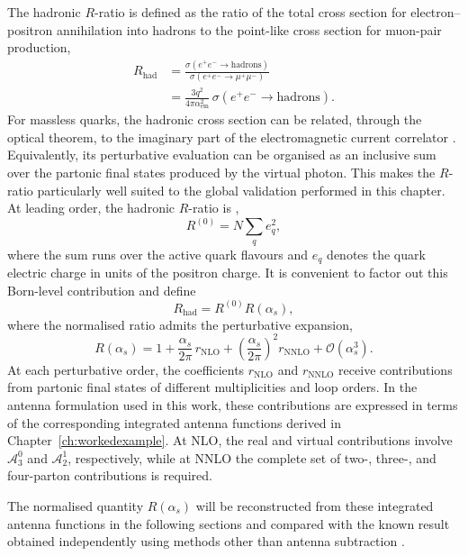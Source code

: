 The hadronic $R$-ratio is defined as the ratio of the total cross section for electron--positron
annihilation into hadrons to the point-like cross section for muon-pair production,
\begin{equation}
    \begin{split}
        R_\text{had} &= \frac{\sigma(e^+e^-\to\text{hadrons})}{\sigma(e^+e^-\to\mu^+\mu^-)}\\
          &= \frac{3q^2}{4\pi\alpha_\text{em}^2}\,\sigma(e^+e^-\to\text{hadrons}).
    \end{split}
\end{equation}
For massless quarks, the hadronic cross section can be related, through the optical theorem, to the
imaginary part of the electromagnetic current correlator
\cite{GehrmannDeRidder0311276,Adler1974}. Equivalently, its perturbative evaluation can be organised
as an inclusive sum over the partonic final states produced by the virtual photon. This makes the
$R$-ratio particularly well suited to the global validation performed in this chapter. At leading
order, the hadronic $R$-ratio is \cite{Ellis:1996mzs},
\begin{equation}
    R^{(0)} = N\sum_q e_q^2,
\end{equation}
where the sum runs over the active quark flavours and $e_q$ denotes the quark electric charge in
units of the positron charge. It is convenient to factor out this Born-level contribution and define
\begin{equation}
    R_\text{had} = R^{(0)}R(\alpha_s),
\end{equation}
where the normalised ratio admits the perturbative expansion,
\begin{equation}
    R(\alpha_s) = 1 + \frac{\alpha_s}{2\pi}\,r_\text{NLO} + \left(\frac{\alpha_s}{2\pi}\right)^2 r_\text{NNLO} + \mathcal O\!\left(\alpha_s^3\right).
\end{equation}
At each perturbative order, the coefficients $r_\text{NLO}$ and $r_\text{NNLO}$ receive contributions
from partonic final states of different multiplicities and loop orders. In the antenna formulation
used in this work, these contributions are expressed in terms of the corresponding integrated antenna
functions derived in Chapter~\ref{ch:workedexample}. At NLO, the real and virtual contributions
involve $\mathcal A_3^0$ and $\mathcal A_2^1$, respectively, while at NNLO the complete set of two-,
three-, and four-parton contributions is required.

The normalised quantity $R(\alpha_s)$ will be reconstructed from these integrated antenna functions
in the following sections and compared with the known result obtained independently using methods
other than antenna subtraction \cite{Dine:1979qh}.

